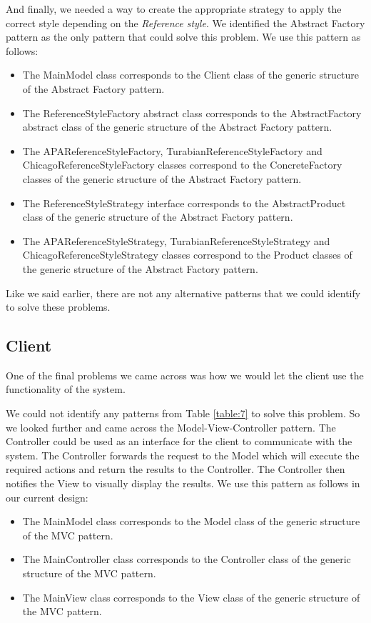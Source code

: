 \documentclass[a4paper]{article}
\begin{document}
And finally, we needed a way to create the appropriate strategy to apply the correct style depending on the \textit{Reference style}. We identified the Abstract Factory pattern as the only pattern that could solve this problem. We use this pattern as follows:

\begin{itemize}
	\item The MainModel class corresponds to the Client class of the generic structure of the Abstract Factory pattern.
	\item The ReferenceStyleFactory abstract class corresponds to the AbstractFactory abstract class of the generic structure of the Abstract Factory pattern.
	\item The APAReferenceStyleFactory, TurabianReferenceStyleFactory and ChicagoReferenceStyleFactory classes correspond to the ConcreteFactory classes of the generic structure of the Abstract Factory pattern.
	\item The ReferenceStyleStrategy interface corresponds to the AbstractProduct class of the generic structure of the Abstract Factory pattern.
	\item The APAReferenceStyleStrategy, TurabianReferenceStyleStrategy and ChicagoReferenceStyleStrategy classes correspond to the Product classes of the generic structure of the Abstract Factory pattern.
\end{itemize}

Like we said earlier, there are not any alternative patterns that we could identify to solve these problems.

\subsection{Client}
One of the final problems we came across was how we would let the client use the functionality of the system. 

We could not identify any patterns from Table \ref{table:7} to solve this problem. So we looked further and came across the Model-View-Controller pattern. The Controller could be used as an interface for the client to communicate with the system. The Controller forwards the request to the Model which will execute the required actions and return the results to the Controller. The Controller then notifies the View to visually display the results. We use this pattern as follows in our current design:

\begin{itemize}
	\item The MainModel class corresponds to the Model class of the generic structure of the MVC pattern.
	\item The MainController class corresponds to the Controller class of the generic structure of the MVC pattern.
	\item The MainView class corresponds to the View class of the generic structure of the MVC pattern.
\end{itemize}
\end{document}
